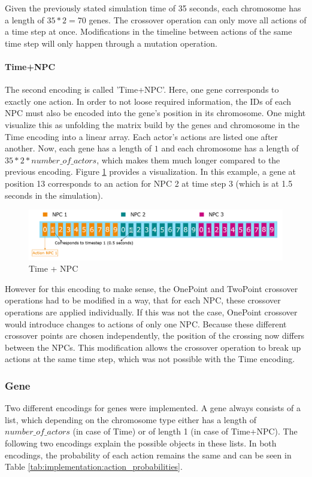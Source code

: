 Given the previously stated simulation time of 35 seconds, each chromosome has a length of $35 * 2 = 70$ genes. The crossover operation can only move all actions of a time step at once. Modifications in the timeline between actions of the same time step will only happen through a mutation operation.

\paragraph{Time+NPC}
The second encoding is called 'Time+NPC'. Here, one gene corresponds to exactly one action. In order to not loose required information, the IDs of each NPC must also be encoded into the gene's position in its chromosome. One might visualize this as unfolding the matrix build by the genes and chromosome in the Time encoding into a linear array. Each actor's actions are listed one after another. Now, each gene has a length of $1$ and each chromosome has a length of $35 * 2 * number\_of\_actors$, which makes them much longer compared to the previous encoding. Figure \ref{fig:implementation:encoding_chromosome_time_npc} provides a visualization. In this example, a gene at position 13 corresponds to an action for NPC 2 at time step 3 (which is at 1.5 seconds in the simulation).

\begin{figure}[ht] 
	\includegraphics[width=1\linewidth]{figures/time_npc_encoding}
	\caption{Time + NPC}
	\label{fig:implementation:encoding_chromosome_time_npc}
\end{figure}

However for this encoding to make sense, the OnePoint and TwoPoint crossover operations had to be modified in a way, that for each NPC, these crossover operations are applied individually. If this was not the case, OnePoint crossover would introduce changes to actions of only one NPC. Because these different crossover points are chosen independently, the position of the crossing now differs between the NPCs. This modification allows the crossover operation to break up actions at the same time step, which was not possible with the Time encoding.

\subsubsection{Gene}
Two different encodings for genes were implemented. A gene always consists of a list, which depending on the chromosome type either has a length of $number\_of\_actors$ (in case of Time) or of length 1 (in case of Time+NPC). The following two encodings explain the possible objects in these lists. In both encodings, the probability of each action remains the same and can be seen in Table \ref{tab:implementation:action_probabilities}.

